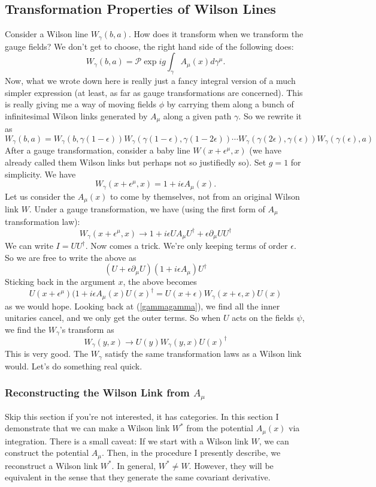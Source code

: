 \documentclass[main.tex]{subfiles}
\begin{document}
\subsection{Transformation Properties of Wilson Lines}
Consider a Wilson line $W_\gamma (b,a)$. How does it transform when we transform the gauge fields? We don't get to choose, the right hand side of the following does:
\[
W_\gamma(b,a) = \mathcal{P} \exp{ig \int_\gamma A_\mu (x) d \gamma^\mu}.
\]
Now, what we wrote down here is really just a fancy integral version of a much simpler expression (at least, as far as gauge transformations are concerned). This is really giving me a way of moving fields $\phi$ by carrying them along a bunch of infinitesimal Wilson links generated by $A_\mu$ along a given path $\gamma$. So we rewrite it as
\begin{equation} \label{gammagamma}
W_\gamma (b,a) = 
W_\gamma (b, \gamma(1-\epsilon)) 
W_\gamma(\gamma(1-\epsilon),\gamma(1-2\epsilon)) \cdots
W_\gamma(\gamma(2\epsilon),\gamma(\epsilon))
W_\gamma(\gamma(\epsilon),a)
\end{equation}
After a gauge transformation, consider a baby line $W(x + \epsilon^\mu, x)$ (we have already called them Wilson links but perhaps not so justifiedly so). Set $g = 1$ for simplicity. We have
\[
W_\gamma (x+ \epsilon^\mu,x) = 1 + i \epsilon A_\mu (x).
\]
Let us consider the $A_\mu (x)$ to come by themselves, not from an original Wilson link $W$. Under a gauge transformation, we have (using the first form of $A_\mu$ transformation law):
\[
W_\gamma(x + \epsilon^\mu,x) \to 1 + i \epsilon U A_\mu U^\dagger + \epsilon \partial_\mu U U^\dagger
\]
We can write $I = U U^\dagger$. Now comes a trick. We're only keeping terms of order $\epsilon$. So we are free to write the above as 
\[
(U + \epsilon \partial_\mu U)(1 + i \epsilon A_\mu)U^\dagger
\]
Sticking back in the argument $x$, the above becomes
\[
U(x + \epsilon^\mu)(1 + i \epsilon A_\mu (x) U(x)^\dagger = U(x + \epsilon)W_\gamma(x + \epsilon,x)U(x)
\]
as we would hope. Looking back at (\ref{gammagamma}), we find all the inner unitaries cancel, and we only get the outer terms. So when $U$ acts on the fields $\psi$, we find the $W_\gamma$'s transform as 
\begin{equation} \label{wilsontrans}
\boxed{W_\gamma (y,x) \to U(y) W_\gamma (y,x) U(x)^\dagger}
\end{equation}
This is very good. The $W_\gamma$ satisfy the same transformation laws as a Wilson link would. Let's do something real quick.

\subsubsection{Reconstructing the Wilson Link from $A_\mu$}
Skip this section if you're not interested, it has categories. In this section I demonstrate that we can make a Wilson link $W^*$ from the potential $A_\mu (x)$ via integration. There is a small caveat: If we start with a Wilson link $W$, we can construct the potential $A_\mu$. Then, in the procedure I presently describe, we reconstruct a Wilson link $W^*$. In general, $W^* \neq W$. However, they will be equivalent in the sense that they generate the same covariant derivative.
\end{document}
